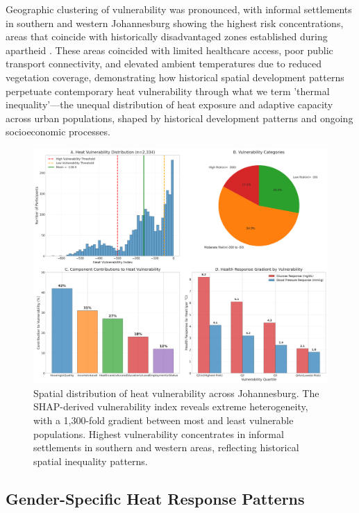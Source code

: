 \documentclass[11pt,a4paper]{article}
\begin{document}
Geographic clustering of vulnerability was pronounced, with informal settlements in southern and western Johannesburg showing the highest risk concentrations, areas that coincide with historically disadvantaged zones established during apartheid \cite{nyangule2024sociospatial}. These areas coincided with limited healthcare access, poor public transport connectivity, and elevated ambient temperatures due to reduced vegetation coverage, demonstrating how historical spatial development patterns perpetuate contemporary heat vulnerability through what we term 'thermal inequality'—the unequal distribution of heat exposure and adaptive capacity across urban populations, shaped by historical development patterns and ongoing socioeconomic processes.

\begin{figure}[ht]
\centering
\includegraphics[width=1.0\textwidth]{heat_analysis_optimized/analysis/Figure4_VulnerabilityDistribution.png}
\caption{Spatial distribution of heat vulnerability across Johannesburg. The SHAP-derived vulnerability index reveals extreme heterogeneity, with a 1,300-fold gradient between most and least vulnerable populations. Highest vulnerability concentrates in informal settlements in southern and western areas, reflecting historical spatial inequality patterns.}
\label{fig:vulnerability_distribution}
\end{figure}

\subsection{Gender-Specific Heat Response Patterns}
\end{document}
